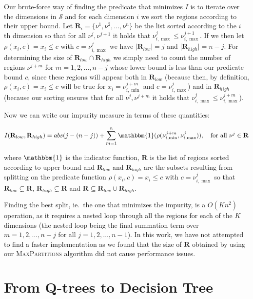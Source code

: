 Our brute-force way of finding the predicate that minimizes $I$ is to iterate
over the dimensions in $\mathcal{S}$ and for each dimension $i$ we sort the
regions according to their upper bound. Let $\mathbf{R}_i = \{ \nu^1, \nu^2,
\ldots, \nu^n \}$ be the list sorted according to the $i$ th dimension so that
for all $\nu^j, \nu^{j+1}$ it holds that $\nu^{j}_{i,\max} \le
\nu^{j+1}_{i,\max}$. If we then let $\rho(x_i,c) = x_i \le c$ with $c =
\nu^{j}_{i,\max}$ we have $|\mathbf{R}_{low}| = j$ and |$\mathbf{R}_{high}| = n
- j$. For determining the size of $\mathbf{R}_{low} \cap \mathbf{R}_{high}$ we
simply need to count the number of regions $\nu^{j+m}$ for $m = 1, 2, \ldots,
n-j$ whose lower bound is less than our predicate bound $c$, since these regions
will appear both in $\mathbf{R}_{low}$ (because then, by definition, $\rho(x_i,c) = x_i
\le c$ will be true for $x_i = \nu^{j+m}_{i,\min}$ and $c = \nu^{j}_{i,\max}$)
and in $\mathbf{R}_{high}$ (because our sorting ensures that for all
$\nu^{j},\nu^{j+m}$ it holds that $\nu^{j}_{i,\max} \le \nu^{j+m}_{i,\max}$).

Now we can write our impurity measure in terms of these quantities:

\[
    I(\mathbf{R}_{low}, \mathbf{R}_{high}) = abs(j - (n - j)) +
    \sum^{n}_{m=1} \mathbbm{1}(\rho(\nu^{j+m}_{i,\min},\nu^{j}_{i,\max})), \quad
    \text{for all }\nu^{j} \in \mathbf{R}
\] 

where $\mathbbm{1}$ is the indicator function, $\mathbf{R}$ is the list of
regions sorted according to upper bound and $\mathbf{R}_{low}$ and
$\mathbf{R}_{high}$ are the subsets resulting from splitting on the predicate
function $\rho(x_i,c) = x_i \le c$ with $c = \nu^{j}_{i,\max}$ so that
$\mathbf{R}_{low} \subsetneq \mathbf{R}$, $\mathbf{R}_{high} \subsetneq
\mathbf{R}$ and $\mathbf{R} \subseteq \mathbf{R}_{low} \cup \mathbf{R}_{high}$.

Finding the best split, ie.\ the one that minimizes the impurity, is a $O(Kn^2)$
operation, as it requires a nested loop through all the regions for each
of the $K $dimensions (the nested loop being the final summation term over $m =
1, 2, \ldots, n - j$ for all $j = 1, 2, \ldots, n - 1$). In this work, we have
not attempted to find a faster implementation as we found that the size of
$\mathbf{R}$ obtained by using our \textsc{MaxPartitions} algorithm did not
cause performance issues.


\section{From Q-trees to Decision Tree}%
\label{sec:convergeToDT}

